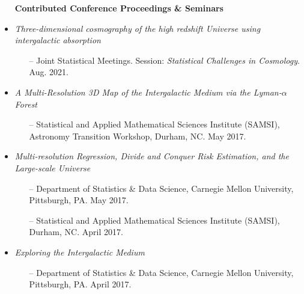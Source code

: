 \documentclass[letterpaper,10pt]{article}
\begin{document}
\begin{itemize}[itemsep=0.3cm]
\item[] \hspace{-6ex} {\bf Contributed Conference Proceedings \& Seminars} 
\vspace{-0.25cm}

\item {\it Three-dimensional cosmography of the high redshift Universe using intergalactic absorption}
\begin{itemize}[leftmargin=0.55cm, itemsep=0.1cm]
\item[--] Joint Statistical Meetings. Session: {\it Statistical Challenges in Cosmology}. Aug. 2021.
\end{itemize}

\item {\it A Multi-Resolution 3D Map of the Intergalactic Medium via the Lyman-$\alpha$ Forest}
\begin{itemize}[leftmargin=0.55cm, itemsep=0.1cm]
\item[--] Statistical and Applied Mathematical Sciences Institute (SAMSI), Astronomy Transition Workshop, Durham, NC. May 2017.
\end{itemize}

\item {\it Multi-resolution Regression, Divide and Conquer Risk Estimation, and the Large-scale Universe}
\begin{itemize}[leftmargin=0.55cm, itemsep=0.1cm]
\item[--] Department of Statistics \& Data Science, Carnegie Mellon University, Pittsburgh, PA. May 2017.
\item[--] Statistical and Applied Mathematical Sciences Institute (SAMSI), Durham, NC. April 2017.
\end{itemize}

\item {\it Exploring the Intergalactic Medium}
\begin{itemize}[leftmargin=0.55cm, itemsep=0.1cm]
\item[--] Department of Statistics \& Data Science, Carnegie Mellon University, Pittsburgh, PA. April 2017.
\end{itemize}
\end{itemize}
\end{document}
